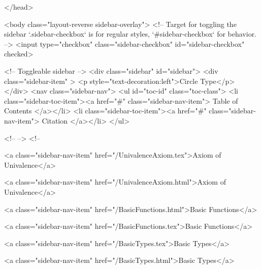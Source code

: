   
</head>




  <body class="layout-reverse sidebar-overlay">
    <!-- Target for toggling the sidebar `.sidebar-checkbox` is for regular
     styles, `#sidebar-checkbox` for behavior. -->
<input type="checkbox" class="sidebar-checkbox" id="sidebar-checkbox" checked>

<!-- Toggleable sidebar -->
<div class="sidebar" id="sidebar">
  <div class="sidebar-item" >
    <p style="text-decoration:left">Circle Type</p>
  </div>
  <nav class="sidebar-nav">
    <ul id="toc-id" class="toc-class">
  <li class="sidebar-toc-item"><a href="#" class="sidebar-nav-item"> Table of Contents </a></li>
  <li class="sidebar-toc-item"><a href="#" class="sidebar-nav-item"> Citation </a></li>
</ul>


    <!--  -->
    <!-- 
      
    
      
    
      
    
      
    
      
        
      
    
      
        
          <a class="sidebar-nav-item" href="/UnivalenceAxiom.tex">Axiom of Univalence</a>
        
      
    
      
        
          <a class="sidebar-nav-item" href="/UnivalenceAxiom.html">Axiom of Univalence</a>
        
      
    
      
        
          <a class="sidebar-nav-item" href="/BasicFunctions.html">Basic Functions</a>
        
      
    
      
        
          <a class="sidebar-nav-item" href="/BasicFunctions.tex">Basic Functions</a>
        
      
    
      
        
          <a class="sidebar-nav-item" href="/BasicTypes.tex">Basic Types</a>
        
      
    
      
        
          <a class="sidebar-nav-item" href="/BasicTypes.html">Basic Types</a>
        
      
    
